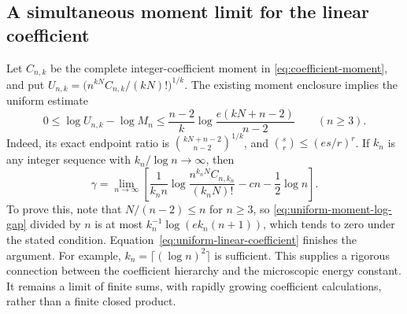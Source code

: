 \documentclass[11pt]{article}
\theoremstyle{remark}
\numberwithin{equation}{section}
\begin{document}
\subsection{A simultaneous moment limit for the linear coefficient}
Let $C_{n,k}$ be the complete integer-coefficient moment in
\eqref{eq:coefficient-moment}, and put
$U_{n,k}=\bigl(n^{kN}C_{n,k}/(kN)!\bigr)^{1/k}$.
The existing moment enclosure implies the uniform estimate
\begin{equation}\label{eq:uniform-moment-log-gap}
 0\le\log U_{n,k}-\log M_n
 \le\frac{n-2}{k}
 \log\frac{e(kN+n-2)}{n-2}\qquad(n\ge3).
\end{equation}
Indeed, its exact endpoint ratio is
$\binom{kN+n-2}{n-2}^{1/k}$, and
$\binom{s}{r}\le(es/r)^r$.
If $k_n$ is any integer sequence with $k_n/\log n\to\infty$, then
\begin{equation}\label{eq:uniform-moment-linear-limit}
 \boxed{\displaystyle
 \gamma=\lim_{n\to\infty}\left[
 \frac1{k_n n}\log\frac{n^{k_nN}C_{n,k_n}}{(k_nN)!}
 -cn-\frac12\log n\right].}
\end{equation}
To prove this, note that $N/(n-2)\le n$ for $n\ge3$, so
\eqref{eq:uniform-moment-log-gap} divided by $n$ is at most
$k_n^{-1}\log(e k_n(n+1))$, which tends to zero under the stated
condition. Equation~\eqref{eq:uniform-linear-coefficient} finishes the
argument. For example, $k_n=\lceil(\log n)^2\rceil$ is sufficient.
This supplies a rigorous connection between the coefficient hierarchy
and the microscopic energy constant. It remains a limit of finite sums,
with rapidly growing coefficient calculations, rather than a finite
closed product.
\end{document}
